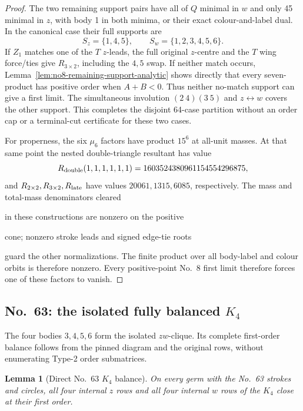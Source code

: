 \documentclass[11pt]{amsart}
\newtheorem{lemma}[theorem]{Lemma}
\theoremstyle{remark}
\newcommand{\Needspace}[1]{\par\ifdim\dimexpr\pagegoal-\pagetotal\relax<#1\newpage\fi}
\begin{document}
\begin{proof}
The two remaining support pairs have all of $Q$ minimal in $w$ and only 45 minimal in $z$, with body 1 in both minima, or their exact colour-and-label dual. In the canonical case their full supports are
\[
S_z=\{1,4,5\},\qquad S_w=\{1,2,3,4,5,6\}.
\]
If $Z_1$ matches one of the $T$ $z$-leads, the full original $z$-centre and the $T$ wing force/ties give $R_{3\times2}$, including the $4,5$ swap. If neither match occurs, Lemma~\ref{lem:no8-remaining-support-analytic} shows directly that every seven-product has positive order when $A+B<0$. Thus neither no-match support can give a first limit. The simultaneous involution $(2\ 4)(3\ 5)$ and $z\leftrightarrow w$ covers the other support. This completes the disjoint 64-case partition without an order cap or a terminal-cut certificate for these two cases.

For properness, the six $\mu_6$ factors have product $15^6$ at all-unit masses. At that same point the nested double-triangle resultant has value
\[
R_{\rm double}(1,1,1,1,1,1)=1603524380961154554296875,
\]
and $R_{2\times2},R_{3\times2},R_{\rm late}$ have values $20061,1315,6085$, respectively. The mass and total-mass denominators cleared

in these constructions are nonzero on the positive

cone; nonzero stroke leads and signed edge-tie roots

guard the other normalizations. The finite product over all body-label and colour orbits is therefore nonzero.
Every positive-point No.~8 first limit therefore forces one of these factors to vanish.

\end{proof}

\Needspace{9\baselineskip}
\subsection{No.~63: the isolated fully balanced $K_4$}

The four bodies $3,4,5,6$ form the isolated $zw$-clique.
Its complete first-order balance follows from the pinned
diagram and the original rows, without enumerating Type-2
order submatrices.
\begin{lemma}[Direct No.~63 $K_4$ balance]
\label{lem:no63-direct-balance}
On every germ with the No.~63 strokes and circles, all
four internal $z$ rows and all four internal $w$ rows
of the $K_4$ close at their first order.

\end{lemma}
\end{document}
